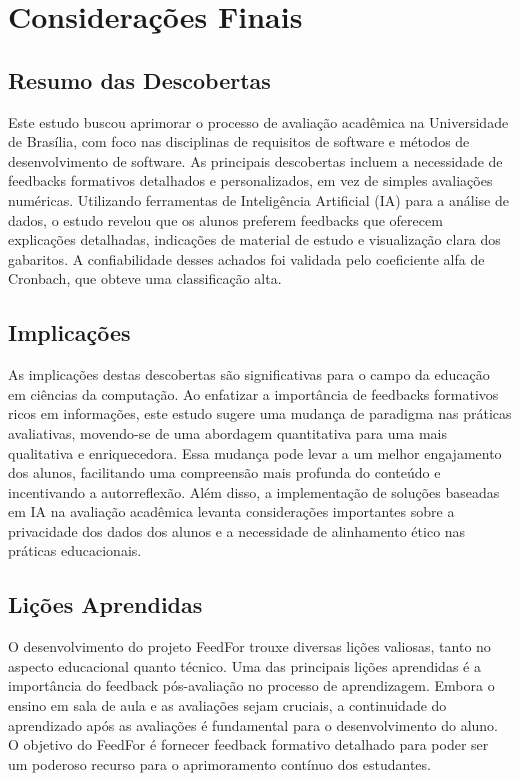 \chapter{Considerações Finais}

\section{Resumo das Descobertas}

Este estudo buscou aprimorar o processo de avaliação acadêmica na Universidade de Brasília, com foco nas disciplinas de requisitos de software e métodos de desenvolvimento de software. As principais descobertas incluem a necessidade de feedbacks formativos detalhados e personalizados, em vez de simples avaliações numéricas. Utilizando ferramentas de Inteligência Artificial (IA) para a análise de dados, o estudo revelou que os alunos preferem feedbacks que oferecem explicações detalhadas, indicações de material de estudo e visualização clara dos gabaritos. A confiabilidade desses achados foi validada pelo coeficiente alfa de Cronbach, que obteve uma classificação alta.

\section{Implicações}

As implicações destas descobertas são significativas para o campo da educação em ciências da computação. Ao enfatizar a importância de feedbacks formativos ricos em informações, este estudo sugere uma mudança de paradigma nas práticas avaliativas, movendo-se de uma abordagem quantitativa para uma mais qualitativa e enriquecedora. Essa mudança pode levar a um melhor engajamento dos alunos, facilitando uma compreensão mais profunda do conteúdo e incentivando a autorreflexão. Além disso, a implementação de soluções baseadas em IA na avaliação acadêmica levanta considerações importantes sobre a privacidade dos dados dos alunos e a necessidade de alinhamento ético nas práticas educacionais.

\section{Lições Aprendidas}

O desenvolvimento do projeto FeedFor trouxe diversas lições valiosas, tanto no aspecto educacional quanto técnico. Uma das principais lições aprendidas é a importância do feedback pós-avaliação no processo de aprendizagem. Embora o ensino em sala de aula e as avaliações sejam cruciais, a continuidade do aprendizado após as avaliações é fundamental para o desenvolvimento do aluno. O objetivo do FeedFor é fornecer feedback formativo detalhado para poder ser um poderoso recurso para o aprimoramento contínuo dos estudantes.

